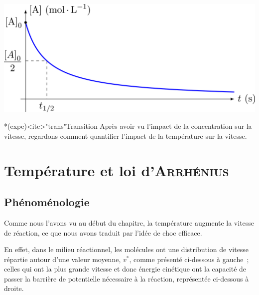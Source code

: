 \documentclass[../../main/main.tex]{subfiles}
\begin{document}
\begin{tcb}[label=ror:resumeordre, tabularx={l|Y|Y|Y}]
\begin{center}
{		}{
			\includegraphics[width=\linewidth]{ordre2}
		}
	\end{center}
\end{tcb}

\begin{tcb}*(expe)<itc>"trans"{Transition}
	Après avoir vu l'impact de la concentration sur la vitesse, regardons
	comment quantifier l'impact de la température sur la vitesse.
\end{tcb}

\vspace{-15pt}
\section{Température et loi d'\textsc{Arrhénius}}
\subsection{Phénoménologie}
Comme nous l'avons vu au début du chapitre, la température augmente la vitesse
de réaction, ce que nous avons traduit par l'idée de choc efficace.

En effet, dans le milieu réactionnel, les molécules ont une distribution de
vitesse répartie autour d'une valeur moyenne, $v^*$, comme présenté ci-dessous à
gauche~; celles qui ont la plus grande vitesse et donc énergie cinétique ont la
capacité de passer la barrière de potentielle nécessaire à la réaction,
représentée ci-dessous à droite.
\end{document}
